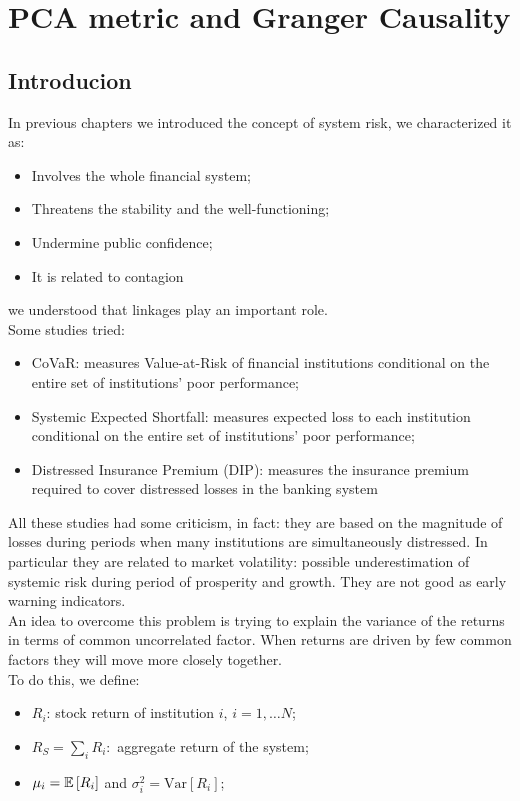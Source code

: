 \chapter{PCA metric and Granger Causality}
\label{chap:pca_metrics}
\section{Introducion}
In previous chapters we introduced the concept of system risk, we characterized it as:
\begin{itemize}
	\item Involves the whole financial system;
	\item Threatens the stability and the well-functioning;  
	\item Undermine public confidence;
	\item It is related to contagion
\end{itemize}
we understood that linkages play an important role.\\
Some studies tried:
\begin{itemize}
	\item CoVaR: measures Value-at-Risk of financial institutions conditional on the entire set of institutions’ poor performance;
	\item Systemic Expected Shortfall: measures expected loss to each institution
	conditional on the entire set of institutions’ poor performance;
	\item Distressed Insurance Premium (DIP): measures the insurance premium required to cover distressed losses in the banking system
\end{itemize}
All these studies had some criticism, in fact: they are based on the magnitude of losses during periods when many institutions are simultaneously distressed. In particular they are related to market volatility: possible underestimation of systemic risk during period of prosperity and growth. They are not good as early warning indicators.\\
An idea to overcome this problem is trying to explain the variance of the returns in terms of common uncorrelated factor. When returns are driven by few common factors they will move more closely together.\\
To do this, we define:
\begin{itemize}
	\item $R_i$: stock return of institution $i$, $i = 1,\ldots N$;
	\item $R_S = \sum_i R_i:$ aggregate return of the system;
	\item $\mu_i = \mathbb{E}\left[R_i\right]$ and $\sigma_i^2 = \text{Var}[R_i]$;
\end{itemize}
